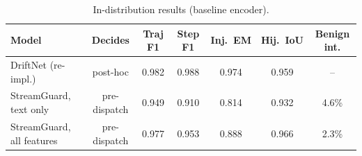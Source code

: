 \begin{table}[t]\centering\small
\begin{tabular}{lcccccc}\toprule
Model & Decides & Traj F1 & Step F1 & Inj.\ EM & Hij.\ IoU & Benign int. \\\midrule
DriftNet (re-impl.) & post-hoc & 0.982 & 0.988 & 0.974 & 0.959 & -- \\
StreamGuard, text only & pre-dispatch & 0.949 & 0.910 & 0.814 & 0.932 & 4.6\% \\
StreamGuard, all features & pre-dispatch & 0.977 & 0.953 & 0.888 & 0.966 & 2.3\% \\\bottomrule
\end{tabular}
\caption{In-distribution results (baseline encoder).}
\end{table}

